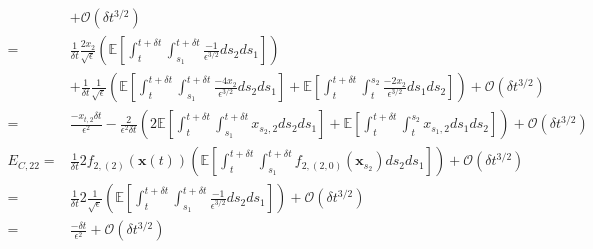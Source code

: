\begin{equation}
\begin{aligned}
&+ \mathcal{O} (\delta t^{3/2}) \\
=&
\frac{1}{\delta t} \frac{2 x_2}{\sqrt{\epsilon}} \left( \mathbb{E} \left[ \int_t^{t+\delta t} \int_{s_1}^{t+\delta t} \frac{-1}{\epsilon^{3/2}} ds_2 ds_1 \right]  \right) \\
&+ \frac{1}{\delta t} \frac{1}{\sqrt{\epsilon}} \left( \mathbb{E} \left[ \int_t^{t+\delta t} \int_{s_1}^{t + \delta t} \frac{-4 x_2}{\epsilon^{3/2}} ds_2 ds_1 \right]
+ \mathbb{E} \left[ \int_t^{t+\delta t} \int_t^{s_2} \frac{-2 x_2}{\epsilon^{3/2}} ds_1 ds_2 \right] \right)
+ \mathcal{O} (\delta t^{3/2}) \\
=&
 \frac{- x_{t,2} \delta t}{\epsilon^2}
- \frac{2}{\epsilon^2 \delta t} \left( 2 \mathbb{E} \left[ \int_t^{t+\delta t} \int_{s_1}^{t + \delta t} x_{s_2,2} ds_2 ds_1 \right]
+ \mathbb{E} \left[ \int_t^{t+\delta t} \int_t^{s_2} x_{s_1,2} ds_1 ds_2 \right] \right)
+ \mathcal{O} (\delta t^{3/2}) \\
E_{C, 22}
=&
 \frac{1}{\delta t} 2 f_{2,(2)}(\mathbf{x}(t)) \left( \mathbb{E} \left[ \int_t^{t+\delta t} \int_{s_1}^{t+\delta t} f_{2,(2,0)}(\mathbf{x}_{s_2}) ds_2 ds_1 \right]  \right)
+ \mathcal{O} (\delta t^{3/2}) \\
=&
 \frac{1}{\delta t} 2 \frac{1}{\sqrt{\epsilon}} \left( \mathbb{E} \left[ \int_t^{t+\delta t} \int_{s_1}^{t+\delta t} \frac{-1}{\epsilon^{3/2}} ds_2 ds_1 \right]  \right)
+ \mathcal{O} (\delta t^{3/2})\\
=&
\frac{-\delta t}{\epsilon^2}
+ \mathcal{O} (\delta t^{3/2})
\end{aligned}
\end{equation} 